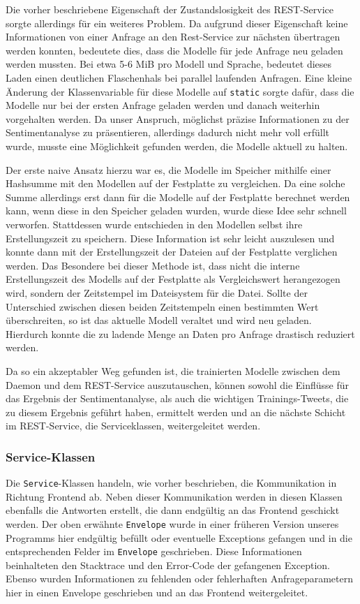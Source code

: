 Die vorher beschriebene Eigenschaft der Zustandslosigkeit des REST-Service sorgte allerdings für ein weiteres Problem. Da aufgrund dieser Eigenschaft keine Informationen von einer Anfrage an den Rest-Service zur nächsten übertragen werden konnten, bedeutete dies, dass die Modelle für jede Anfrage neu geladen werden mussten. Bei etwa 5-6 MiB pro Modell und Sprache, bedeutet dieses Laden einen deutlichen Flaschenhals bei parallel laufenden Anfragen. Eine kleine Änderung der Klassenvariable für diese Modelle auf \texttt{static} sorgte dafür, dass die Modelle nur bei der ersten Anfrage geladen werden und danach weiterhin vorgehalten werden. Da unser Anspruch, möglichst präzise Informationen zu der Sentimentanalyse zu präsentieren, allerdings dadurch nicht mehr voll erfüllt wurde, musste eine Möglichkeit gefunden werden, die Modelle aktuell zu halten.

Der erste naive Ansatz hierzu war es, die Modelle im Speicher mithilfe einer Hashsumme mit den Modellen auf der Festplatte zu vergleichen. Da eine solche Summe allerdings erst dann für die Modelle auf der Festplatte berechnet werden kann, wenn diese in den Speicher geladen wurden, wurde diese Idee sehr schnell verworfen. Stattdessen wurde entschieden in den Modellen selbst ihre Erstellungszeit zu speichern. Diese Information ist sehr leicht auszulesen und konnte dann mit der Erstellungszeit der Dateien auf der Festplatte verglichen werden. Das Besondere bei dieser Methode ist, dass nicht die interne Erstellungszeit des Modells auf der Festplatte als Vergleichswert herangezogen wird, sondern der Zeitstempel im Dateisystem für die Datei. Sollte der Unterschied zwischen diesen beiden Zeitstempeln einen bestimmten Wert überschreiten, so ist das aktuelle Modell veraltet und wird neu geladen. Hierdurch konnte die zu ladende Menge an Daten pro Anfrage drastisch reduziert werden.

Da so ein akzeptabler Weg gefunden ist, die trainierten Modelle zwischen dem Daemon und dem REST-Service auszutauschen, können sowohl die Einflüsse für das Ergebnis der Sentimentanalyse, als auch die wichtigen Trainings-Tweets, die zu diesem Ergebnis geführt haben, ermittelt werden und an die nächste Schicht im REST-Service, die Serviceklassen, weitergeleitet werden.

\subsubsection{Service-Klassen}
\label{sec:serviceklassen}
Die \texttt{Service}-Klassen handeln, wie vorher beschrieben, die Kommunikation in Richtung Frontend ab. Neben dieser Kommunikation werden in diesen Klassen ebenfalls die Antworten erstellt, die dann endgültig an das Frontend geschickt werden. Der oben erwähnte \texttt{Envelope} wurde in einer früheren Version unseres Programms hier endgültig befüllt oder eventuelle Exceptions gefangen und in die entsprechenden Felder im \texttt{Envelope} geschrieben. Diese Informationen beinhalteten den Stacktrace und den Error-Code der gefangenen Exception. Ebenso wurden Informationen zu fehlenden oder fehlerhaften Anfrageparametern hier in einen Envelope geschrieben und an das Frontend weitergeleitet.  

